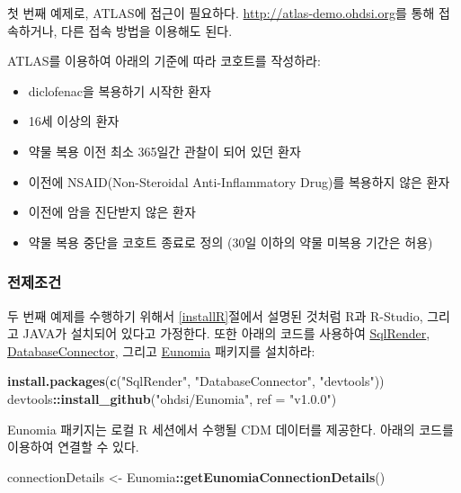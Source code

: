 \documentclass[10.5pt]{book}
\newenvironment{Shaded}{\begin{snugshade}}{\end{snugshade}}
\newcommand{\KeywordTok}[1]{\textcolor[rgb]{0.13,0.29,0.53}{\textbf{#1}}}
\newcommand{\DataTypeTok}[1]{\textcolor[rgb]{0.13,0.29,0.53}{#1}}
\newcommand{\StringTok}[1]{\textcolor[rgb]{0.31,0.60,0.02}{#1}}
\newcommand{\OperatorTok}[1]{\textcolor[rgb]{0.81,0.36,0.00}{\textbf{#1}}}
\newcommand{\NormalTok}[1]{#1}
\providecommand{\tightlist}{%
  \setlength{\itemsep}{0pt}\setlength{\parskip}{0pt}}
\theoremstyle{definition}
\theoremstyle{definition}
\theoremstyle{definition}
\theoremstyle{remark}
\let\BeginKnitrBlock\begin \let\EndKnitrBlock\end
\begin{document}
첫 번째 예제로, ATLAS에 접근이 필요하다.
\url{http://atlas-demo.ohdsi.org}를 통해 접속하거나, 다른 접속 방법을
이용해도 된다.

\BeginKnitrBlock{exercise}
\protect\hypertarget{exr:exerciseCohortsAtlas}{}{\label{exr:exerciseCohortsAtlas}
}ATLAS를 이용하여 아래의 기준에 따라 코호트를 작성하라:

\begin{itemize}
\tightlist
\item
  diclofenac을 복용하기 시작한 환자
\item
  16세 이상의 환자
\item
  약물 복용 이전 최소 365일간 관찰이 되어 있던 환자
\item
  이전에 NSAID(Non-Steroidal Anti-Inflammatory Drug)를 복용하지 않은
  환자
\item
  이전에 암을 진단받지 않은 환자
\item
  약물 복용 중단을 코호트 종료로 정의 (30일 이하의 약물 미복용 기간은
  허용)
\end{itemize}
\EndKnitrBlock{exercise}

\subsubsection*{전제조건}\label{-3}

두 번째 예제를 수행하기 위해서 \ref{installR}절에서 설명된 것처럼 R과
R-Studio, 그리고 JAVA가 설치되어 있다고 가정한다. 또한 아래의 코드를
사용하여 \href{https://ohdsi.github.io/SqlRender/}{SqlRender},
\href{https://ohdsi.github.io/DatabaseConnector/}{DatabaseConnector},
그리고 \href{https://ohdsi.github.io/Eunomia/}{Eunomia} 패키지를
설치하라:

\begin{Shaded}
\begin{Highlighting}[]
\KeywordTok{install.packages}\NormalTok{(}\KeywordTok{c}\NormalTok{(}\StringTok{"SqlRender"}\NormalTok{, }\StringTok{"DatabaseConnector"}\NormalTok{, }\StringTok{"devtools"}\NormalTok{))}
\NormalTok{devtools}\OperatorTok{::}\KeywordTok{install_github}\NormalTok{(}\StringTok{"ohdsi/Eunomia"}\NormalTok{, }\DataTypeTok{ref =} \StringTok{"v1.0.0"}\NormalTok{)}
\end{Highlighting}
\end{Shaded}

Eunomia 패키지는 로컬 R 세션에서 수행될 CDM 데이터를 제공한다. 아래의
코드를 이용하여 연결할 수 있다.

\begin{Shaded}
\begin{Highlighting}[]
\NormalTok{connectionDetails <-}\StringTok{ }\NormalTok{Eunomia}\OperatorTok{::}\KeywordTok{getEunomiaConnectionDetails}\NormalTok{()}
\end{Highlighting}
\end{Shaded}
\end{document}
